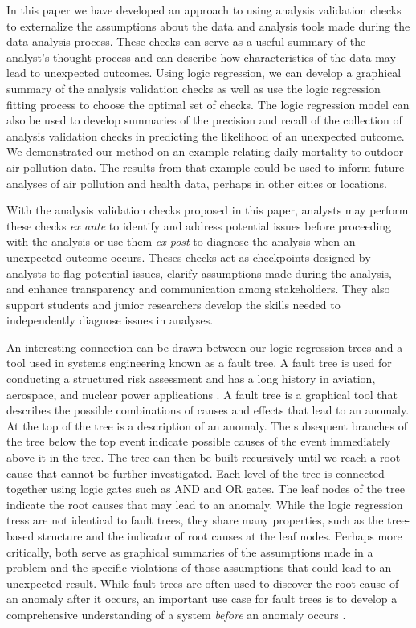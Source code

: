 \documentclass[
  12pt,
]{interact}
\begin{document}
In this paper we have developed an approach to using analysis validation
checks to externalize the assumptions about the data and analysis tools
made during the data analysis process. These checks can serve as a
useful summary of the analyst's thought process and can describe how
characteristics of the data may lead to unexpected outcomes. Using logic
regression, we can develop a graphical summary of the analysis
validation checks as well as use the logic regression fitting process to
choose the optimal set of checks. The logic regression model can also be
used to develop summaries of the precision and recall of the collection
of analysis validation checks in predicting the likelihood of an
unexpected outcome. We demonstrated our method on an example relating
daily mortality to outdoor air pollution data. The results from that
example could be used to inform future analyses of air pollution and
health data, perhaps in other cities or locations.

With the analysis validation checks proposed in this paper, analysts may
perform these checks \emph{ex ante} to identify and address potential
issues before proceeding with the analysis or use them \emph{ex post} to
diagnose the analysis when an unexpected outcome occurs. Theses checks
act as checkpoints designed by analysts to flag potential issues,
clarify assumptions made during the analysis, and enhance transparency
and communication among stakeholders. They also support students and
junior researchers develop the skills needed to independently diagnose
issues in analyses.

An interesting connection can be drawn between our logic regression
trees and a tool used in systems engineering known as a fault tree. A
fault tree is used for conducting a structured risk assessment and has a
long history in aviation, aerospace, and nuclear power applications
\citep{vesely1981fault}. A fault tree is a graphical tool that describes
the possible combinations of causes and effects that lead to an anomaly.
At the top of the tree is a description of an anomaly. The subsequent
branches of the tree below the top event indicate possible causes of the
event immediately above it in the tree. The tree can then be built
recursively until we reach a root cause that cannot be further
investigated. Each level of the tree is connected together using logic
gates such as AND and OR gates. The leaf nodes of the tree indicate the
root causes that may lead to an anomaly. While the logic regression
tress are not identical to fault trees, they share many properties, such
as the tree-based structure and the indicator of root causes at the leaf
nodes. Perhaps more critically, both serve as graphical summaries of the
assumptions made in a problem and the specific violations of those
assumptions that could lead to an unexpected result. While fault trees
are often used to discover the root cause of an anomaly after it occurs,
an important use case for fault trees is to develop a comprehensive
understanding of a system \emph{before} an anomaly occurs
\citep{michael2002fault}.
\end{document}
